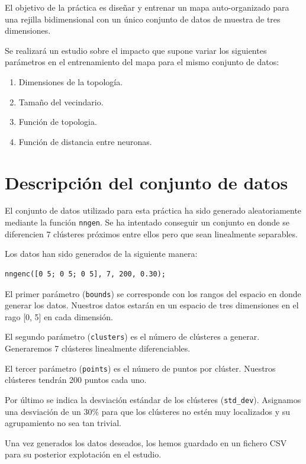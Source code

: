 \documentclass[a4paper,12pt,titlepage]{article}
\begin{document}
El objetivo de la práctica es diseñar y entrenar un mapa auto-organizado para una rejilla bidimensional con un único conjunto de datos de muestra de tres dimensiones. 

Se realizará un estudio sobre el impacto que supone variar los siguientes parámetros en el entrenamiento del mapa para el mismo conjunto de datos:

\begin{enumerate}[noitemsep]
	\item Dimensiones de la topología.
	\item Tamaño del vecindario.
	\item Función de topologia.
	\item Función de distancia entre neuronas.
\end{enumerate}

\section{Descripción del conjunto de datos}

El conjunto de datos utilizado para esta práctica ha sido generado aleatoriamente mediante la función \lstinline|nngen|. Se ha intentado conseguir un conjunto en donde se diferencien 7 clústeres próximos entre ellos pero que sean linealmente separables.

Los datos han sido generados de la siguiente manera:

\begin{lstlisting}
nngenc([0 5; 0 5; 0 5], 7, 200, 0.30);
\end{lstlisting}

El primer parámetro (\lstinline|bounds|) se corresponde con los rangos del espacio en donde generar los datos. Nuestros datos estarán en un espacio de tres dimensiones en el rago [0, 5] en cada dimensión.

El segundo parámetro (\lstinline|clusters|) es el número de clústeres a generar. Generaremos 7 clústeres linealmente diferenciables.

El tercer parámetro (\lstinline|points|) es el número de puntos por clúster. Nuestros clústeres tendrán 200 puntos cada uno.

Por último se indica la desviación estándar de los clústeres (\lstinline|std_dev|). Asignamos una desviación de un 30\% para que los clústeres no estén muy localizados y su agrupamiento no sea tan trivial.

Una vez generados los datos deseados, los hemos guardado en un fichero CSV para su posterior explotación en el estudio. 
\end{document}
